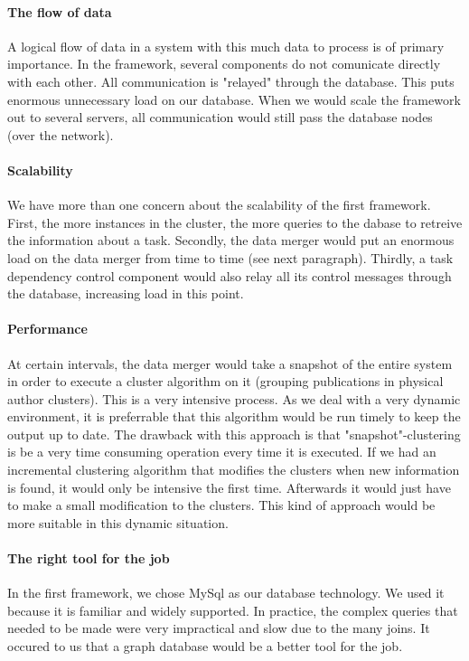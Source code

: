 \paragraph{The flow of data} A logical flow of data in a system with this much data to process is of primary importance. In the framework, several components do not comunicate directly with each other. All communication is "relayed" through the database. This puts enormous unnecessary load on our database. When we would scale the framework out to several servers, all communication would still pass the database nodes (over the network).

\paragraph{Scalability} We have more than one concern about the scalability of the first framework. First, the more instances in the cluster, the more queries to the dabase to retreive the information about a task. Secondly, the data merger would put an enormous load on the data merger from time to time (see next paragraph). Thirdly, a task dependency control component would also relay all its control messages through the database, increasing load in this point.

\paragraph{Performance} At certain intervals, the data merger would take a snapshot of the entire system in order to execute a cluster algorithm on it (grouping publications in physical author clusters). This is a very intensive process. As we deal with a very dynamic environment, it is preferrable that this algorithm would be run timely to keep the output up to date. The drawback with this approach is that "snapshot"-clustering is be a very time consuming operation every time it is executed. If we had an incremental clustering algorithm that modifies the clusters when new information is found, it would only be intensive the first time. Afterwards it would just have to make a small modification to the clusters. This kind of approach would be more suitable in this dynamic situation.

\paragraph{The right tool for the job} In the first framework, we chose MySql as our database technology. We used it because it is familiar and widely supported. In practice, the complex queries that needed to be made were very impractical and slow due to the many joins. It occured to us that a graph database would be a better tool for the job.


